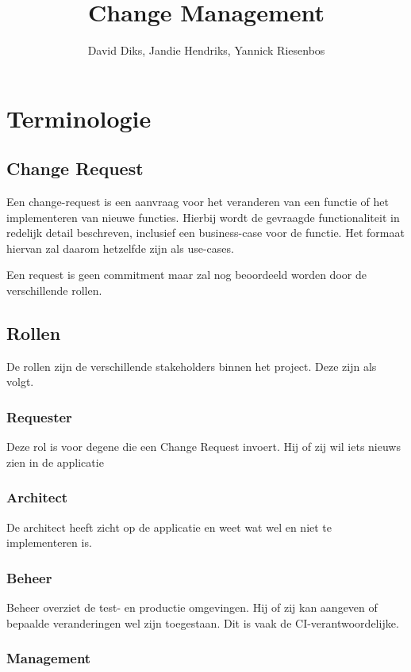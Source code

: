 \documentclass[]{scrreprt}
\title{Change Management}
\author{David Diks, Jandie Hendriks, Yannick Riesenbos}
\begin{document}
\maketitle

\chapter{Terminologie}

\section{Change Request}

	Een change-request is een aanvraag voor het veranderen van een functie of het implementeren van nieuwe functies. Hierbij wordt de gevraagde functionaliteit in redelijk detail beschreven, inclusief een business-case voor de functie. Het formaat hiervan zal daarom hetzelfde zijn als use-cases.
	
	Een request is geen commitment maar zal nog beoordeeld worden door de verschillende rollen.

	\section{Rollen}
	De rollen zijn de verschillende stakeholders binnen het project. Deze zijn als volgt.
	
	\subsection{Requester}
	
	Deze rol is voor degene die een Change Request invoert. Hij of zij wil iets nieuws zien in de applicatie
	
	\subsection{Architect}
	
	De architect heeft zicht op de applicatie en weet wat wel en niet te implementeren is.
	
	\subsection{Beheer}
	
	Beheer overziet de test- en productie omgevingen. Hij of zij kan aangeven of bepaalde veranderingen wel zijn toegestaan. Dit is vaak de  CI-verantwoordelijke.
	
	\subsection{Management}
	
\end{document}
